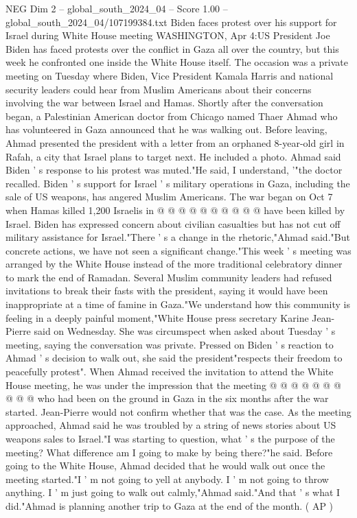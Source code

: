 \begin{textsample}{NEG Dim 2 – global\_south\_2024\_04 – Score 1.00 – global\_south\_2024\_04/107199384.txt}  \label{ex:f2_neg_395}
Biden faces protest over his support for Israel during White House meeting WASHINGTON, Apr 4:US President Joe Biden has faced protests over the conflict in Gaza all over the country, but this week he confronted one inside the White House itself.
The occasion was a private meeting on Tuesday where Biden, Vice President Kamala Harris and national security leaders could hear from Muslim Americans about their concerns involving the war between Israel and Hamas.
Shortly after the conversation began, a Palestinian American doctor from Chicago named Thaer Ahmad who has volunteered in Gaza announced that he was walking out.
Before leaving, Ahmad presented the president with a letter from an orphaned 8-year-old girl in Rafah, a city that Israel plans to target next.
He included a photo.
Ahmad said Biden ' s response to his protest was muted."He said, I understand, '"the doctor recalled.
Biden ' s support for Israel ' s military operations in Gaza, including the sale of US weapons, has angered Muslim Americans.
The war began on Oct 7 when Hamas killed 1,200 Israelis in @ @ @ @ @ @ @ @ @ @ have been killed by Israel.
Biden has expressed concern about civilian casualties but has not cut off military assistance for Israel."There ' s a change in the rhetoric,"Ahmad said."But concrete actions, we have not seen a significant change."This week ' s meeting was arranged by the White House instead of the more traditional celebratory dinner to mark the end of Ramadan.
Several Muslim community leaders had refused invitations to break their fasts with the president, saying it would have been inappropriate at a time of famine in Gaza."We understand how this community is feeling in a deeply painful moment,"White House press secretary Karine Jean-Pierre said on Wednesday.
She was circumspect when asked about Tuesday ' s meeting, saying the conversation was private.
Pressed on Biden ' s reaction to Ahmad ' s decision to walk out, she said the president"respects their freedom to peacefully protest".
When Ahmad received the invitation to attend the White House meeting, he was under the impression that the meeting @ @ @ @ @ @ @ @ @ @ who had been on the ground in Gaza in the six months after the war started.
Jean-Pierre would not confirm whether that was the case.
As the meeting approached, Ahmad said he was troubled by a string of news stories about US weapons sales to Israel."I was starting to question, what ' s the purpose of the meeting?
What difference am I going to make by being there?"he said.
Before going to the White House, Ahmad decided that he would walk out once the meeting started."I ' m not going to yell at anybody.
I ' m not going to throw anything.
I ' m just going to walk out calmly,"Ahmad said."And that ' s what I did."Ahmad is planning another trip to Gaza at the end of the month. ( AP )

\end{textsample}
